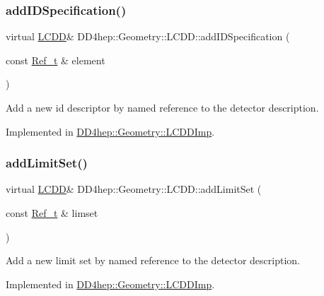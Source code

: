 \subsubsection{\texorpdfstring{add\+I\+D\+Specification()}{addIDSpecification()}}
{\footnotesize\ttfamily virtual \hyperlink{class_d_d4hep_1_1_geometry_1_1_l_c_d_d}{L\+C\+DD}\& D\+D4hep\+::\+Geometry\+::\+L\+C\+D\+D\+::add\+I\+D\+Specification (\begin{DoxyParamCaption}\item[{const \hyperlink{group___d_d4_h_e_p___g_e_o_m_e_t_r_y_ga40af83be6718bb8828a3d83dc7f8c930}{Ref\+\_\+t} \&}]{element }\end{DoxyParamCaption})\hspace{0.3cm}{\ttfamily [pure virtual]}}



Add a new id descriptor by named reference to the detector description. 



Implemented in \hyperlink{class_d_d4hep_1_1_geometry_1_1_l_c_d_d_imp_ac67bb4f3004262373f24c9f02431dbe0}{D\+D4hep\+::\+Geometry\+::\+L\+C\+D\+D\+Imp}.

\hypertarget{class_d_d4hep_1_1_geometry_1_1_l_c_d_d_af11d7a6aaeb91256f14d5892d84e2b30}{}\label{class_d_d4hep_1_1_geometry_1_1_l_c_d_d_af11d7a6aaeb91256f14d5892d84e2b30} 
\subsubsection{\texorpdfstring{add\+Limit\+Set()}{addLimitSet()}}
{\footnotesize\ttfamily virtual \hyperlink{class_d_d4hep_1_1_geometry_1_1_l_c_d_d}{L\+C\+DD}\& D\+D4hep\+::\+Geometry\+::\+L\+C\+D\+D\+::add\+Limit\+Set (\begin{DoxyParamCaption}\item[{const \hyperlink{group___d_d4_h_e_p___g_e_o_m_e_t_r_y_ga40af83be6718bb8828a3d83dc7f8c930}{Ref\+\_\+t} \&}]{limset }\end{DoxyParamCaption})\hspace{0.3cm}{\ttfamily [pure virtual]}}



Add a new limit set by named reference to the detector description. 



Implemented in \hyperlink{class_d_d4hep_1_1_geometry_1_1_l_c_d_d_imp_a846ba4e66d0a38eddaae795bf4b4b43b}{D\+D4hep\+::\+Geometry\+::\+L\+C\+D\+D\+Imp}.

